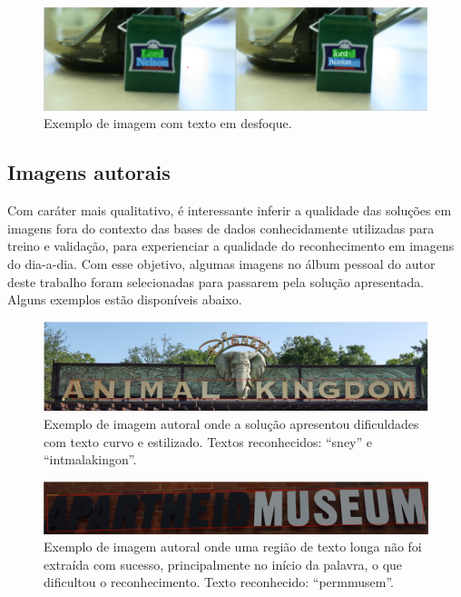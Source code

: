 \begin{figure}
    \centering
    \includegraphics[width=\textwidth]{figs/resultados-icdar13-04.png}
    \caption{Exemplo de imagem com texto em desfoque.}
    \label{fig:results_icdar13_04}
\end{figure}


\subsection{Imagens autorais}\label{sec:results_own_images}
Com caráter mais qualitativo, é interessante inferir a qualidade das soluções em imagens fora do contexto das bases de dados 
conhecidamente utilizadas para treino e validação, para experienciar a qualidade do reconhecimento em imagens do dia-a-dia. 
Com esse objetivo, algumas imagens no álbum pessoal do autor deste trabalho foram selecionadas para passarem pela solução 
apresentada. Alguns exemplos estão disponíveis abaixo.

\begin{figure}
    \centering
    \includegraphics[width=\textwidth]{figs/resultados-autoral-01.png}
    \caption{Exemplo de imagem autoral onde a solução apresentou dificuldades com texto curvo e estilizado. Textos reconhecidos: “sney” e “intmalakingon”.}
    \label{fig:results_own_images_01}
\end{figure}

\begin{figure}
    \centering
    \includegraphics[width=\textwidth]{figs/resultados-autoral-02.png}
    \caption{Exemplo de imagem autoral onde uma região de texto longa não foi extraída com sucesso, principalmente no início 
    da palavra, o que dificultou o reconhecimento. Texto reconhecido: “permmusem”.}
    \label{fig:results_own_images_02}
\end{figure}

